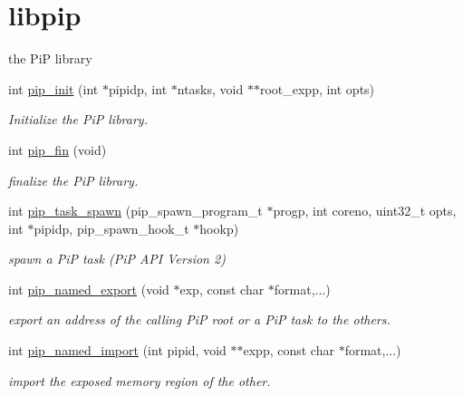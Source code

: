 \hypertarget{group__libpip}{\section{libpip}
\label{group__libpip}
}


the Pi\-P library  


\begin{DoxyCompactItemize}
\item 
int \hyperlink{group__libpip_gad4e0db6c69792b3fa014e3310892a0eb}{pip\-\_\-init} (int $\ast$pipidp, int $\ast$ntasks, void $\ast$$\ast$root\-\_\-expp, int opts)
\begin{DoxyCompactList}\small\item\em Initialize the Pi\-P library. \end{DoxyCompactList}\end{DoxyCompactItemize}
\begin{DoxyCompactItemize}
\item 
int \hyperlink{group__libpip_gac4654282785abb9434ce81573fdf16ed}{pip\-\_\-fin} (void)
\begin{DoxyCompactList}\small\item\em finalize the Pi\-P library. \end{DoxyCompactList}\end{DoxyCompactItemize}
\begin{DoxyCompactItemize}
\item 
int \hyperlink{group__libpip_ga8055012fb65183ce17ad8cd8da292d54}{pip\-\_\-task\-\_\-spawn} (pip\-\_\-spawn\-\_\-program\-\_\-t $\ast$progp, int coreno, uint32\-\_\-t opts, int $\ast$pipidp, pip\-\_\-spawn\-\_\-hook\-\_\-t $\ast$hookp)
\begin{DoxyCompactList}\small\item\em spawn a Pi\-P task (Pi\-P A\-P\-I Version 2) \end{DoxyCompactList}\end{DoxyCompactItemize}
\begin{DoxyCompactItemize}
\item 
int \hyperlink{group__libpip_gab7a5ca6c80e876ef1ea7b42cb2008faa}{pip\-\_\-named\-\_\-export} (void $\ast$exp, const char $\ast$format,...)
\begin{DoxyCompactList}\small\item\em export an address of the calling Pi\-P root or a Pi\-P task to the others. \end{DoxyCompactList}\end{DoxyCompactItemize}
\begin{DoxyCompactItemize}
\item 
int \hyperlink{group__libpip_ga37fed4773558ccab6911785c872bc057}{pip\-\_\-named\-\_\-import} (int pipid, void $\ast$$\ast$expp, const char $\ast$format,...)
\begin{DoxyCompactList}\small\item\em import the exposed memory region of the other. \end{DoxyCompactList}\end{DoxyCompactItemize}
